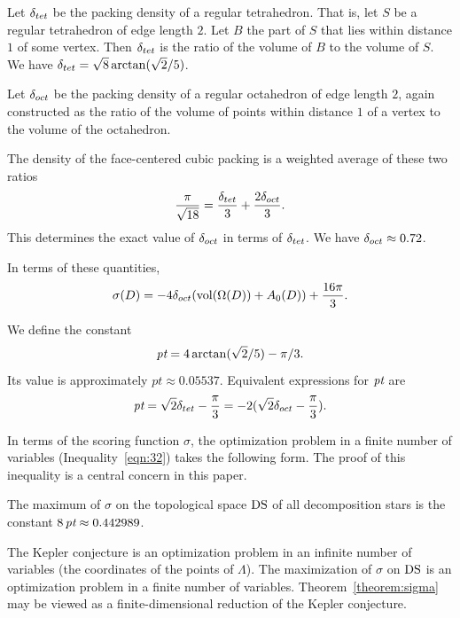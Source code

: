 Let $\delta_{tet}$ be the packing density of a
regular tetrahedron. That is, let $S$ be a regular tetrahedron of
edge length $2$.  Let $B$ the part of $S$ that lies within
distance $1$ of some vertex. Then $\delta_{tet}$ is the ratio of the
volume of $B$ to the volume of $S$. We have $\delta_{tet} = \sqrt{8}
\arctan(\sqrt{2}/5)$.

Let $\delta_{oct}$ be the packing density of a
regular octahedron of edge length $2$, again constructed as the
ratio of the volume of points within distance $1$ of a vertex to
the volume of the octahedron.

The density of the face-centered cubic packing is a weighted average of
these two ratios
    $$\frac{\pi}{\sqrt{18}} = \frac{\delta_{tet}}{3} + \frac{2 \delta_{oct}}{3}.$$
This determines the exact value of $\delta_{oct}$ in terms of $\delta_{tet}$. We have
$\delta_{oct} \approx 0.72$.

In terms of these quantities,
\begin{equation}
    \sigma(D) = -4 \delta_{oct} ({\operatorname{vol}}(\Omega(D)) + A_0(D)) +
    \frac{16\pi}{3}.
\end{equation}

\begin{definition}\label{def:pt}
We define the constant
   $$\hbox{\it pt} = 4\arctan(\sqrt2/5) - \pi/3.$$
Its value is approximately $pt \approx 0.05537.$  Equivalent
expressions for $\hbox{\it pt}$ are
    $$
    \hbox{\it pt} = \sqrt2 \delta_{tet} - \frac{\pi}{3} = -2 (\sqrt2 \delta_{oct} -
    \frac{\pi}{3}).
    $$
\end{definition}


In terms of the scoring function $\sigma$, the optimization
problem in a finite number of variables (Inequality~\ref{eqn:32})
takes the following form. The proof of this inequality is a
central concern in this paper.

\begin{theorem}\label{theorem:sigma}
The maximum of $\sigma$ on the topological space ${\operatorname{DS}}$ of all
decomposition stars is the constant $8\,\hbox{\it pt}\approx 0.442989$.
\end{theorem}

\begin{remark} The Kepler conjecture is an optimization problem in
an infinite number of variables (the coordinates of the points of
$\Lambda$).   The maximization of $\sigma$ on ${\operatorname{DS}}$ is an
optimization problem in a finite number of variables.
Theorem~\ref{theorem:sigma} may be viewed as a finite-dimensional
reduction of the Kepler conjecture.
\end{remark}
\bigskip


